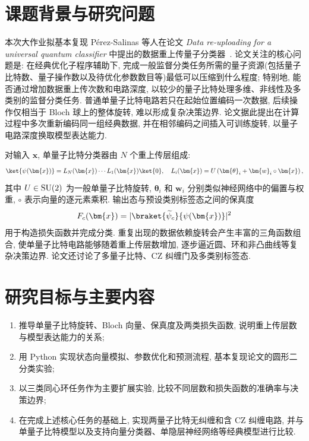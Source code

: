 \documentclass[a4paper]{ctexart}
\begin{document}
\maketitle
\section{课题背景与研究问题}

本次大作业拟基本复现 Pérez-Salinas 等人在论文 \textit{Data re-uploading for a universal quantum classifier} 中提出的数据重上传量子分类器~\cite{paper}. 论文关注的核心问题是: 在经典优化子程序辅助下, 完成一般监督分类任务所需的量子资源(包括量子比特数、量子操作数以及待优化参数数目等)最低可以压缩到什么程度; 特别地, 能否通过增加数据重上传次数和电路深度, 以较少的量子比特处理多维、非线性及多类别的监督分类任务. 普通单量子比特电路若只在起始位置编码一次数据, 后续操作仅相当于 Bloch 球上的整体旋转, 难以形成复杂决策边界. 论文据此提出在计算过程中多次重新编码同一组经典数据, 并在相邻编码之间插入可训练旋转, 以量子电路深度换取模型表达能力.

对输入 $\bm{x}$, 单量子比特分类器由 $N$ 个重上传层组成:
\begin{align*}
    \ket{\psi(\bm{x})}=L_N(\bm{x})\cdots L_1(\bm{x})\ket{0},\q L_i(\bm{x})=U\left(\bm{\theta}_i+\bm{w}_i\circ\bm{x}\right),
\end{align*}
其中 $U\in\text{SU}(2)$ 为一般单量子比特旋转, $\bm{\theta}_i$ 和 $\bm{w}_i$ 分别类似神经网络中的偏置与权重, $\circ$ 表示向量的逐元素乘积. 输出态与预设类别标签态之间的保真度
\begin{align*}
    F_c(\bm{x})=\abs{\braket{\widetilde{\psi}_c}{\psi(\bm{x})}}^2
\end{align*}
用于构造损失函数并完成分类. 重复出现的数据依赖旋转会产生丰富的三角函数组合, 使单量子比特电路能够随着重上传层数增加, 逐步逼近圆、环和非凸曲线等复杂决策边界. 论文还讨论了多量子比特、CZ 纠缠门及多类别标签态.

\section{研究目标与主要内容}

\begin{enumerate}[label=(\arabic*)]
    \item 推导单量子比特旋转、Bloch 向量、保真度及两类损失函数, 说明重上传层数与模型表达能力的关系;
    \item 用 Python 实现状态向量模拟、参数优化和预测流程, 基本复现论文的圆形二分类实验;
    \item 以三类同心环任务作为主要扩展实验, 比较不同层数和损失函数的准确率与决策边界;
    \item 在完成上述核心任务的基础上, 实现两量子比特无纠缠和含 CZ 纠缠电路, 并与单量子比特模型以及支持向量分类器、单隐层神经网络等经典模型进行比较.
\end{enumerate}
\end{document}
